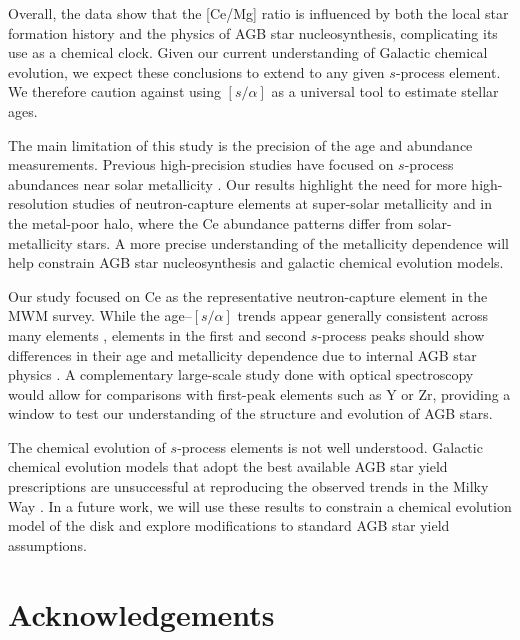 \documentclass[twocolumn,twocolappendix]{aastex701}
\begin{document}
Overall, the data show that the [Ce/Mg] ratio is influenced by both the local star formation history and the physics of AGB star nucleosynthesis, complicating its use as a chemical clock. Given our current understanding of Galactic chemical evolution, we expect these conclusions to extend to any given $s$-process element. We therefore caution against using $[s/\alpha]$ as a universal tool to estimate stellar ages.

The main limitation of this study is the precision of the age and abundance measurements. Previous high-precision studies have focused on $s$-process abundances near solar metallicity \citep[e.g.,][]{nissen_high-precision_2015,tucci_maia_solar_2016,slumstrup_ymg_2017,spina_temporal_2018,nissen_high-precision_2020}. Our results highlight the need for more high-resolution studies of neutron-capture elements at super-solar metallicity and in the metal-poor halo, where the Ce abundance patterns differ from solar-metallicity stars. A more precise understanding of the metallicity dependence will help constrain AGB star nucleosynthesis and galactic chemical evolution models.

Our study focused on Ce as the representative neutron-capture element in the MWM survey. While the age--$[s/\alpha]$ trends appear generally consistent across many elements \citep{casali_tracing_2025}, elements in the first and second $s$-process peaks should show differences in their age and metallicity dependence due to internal AGB star physics \citep{karakas_dawes_2014}. A complementary large-scale study done with optical spectroscopy \citep[e.g., the GALAH survey;][]{buder_galah_2021} would allow for comparisons with first-peak elements such as Y or Zr, providing a window to test our understanding of the structure and evolution of AGB stars.

The chemical evolution of $s$-process elements is not well understood. Galactic chemical evolution models that adopt the best available AGB star yield prescriptions are unsuccessful at reproducing the observed trends in the Milky Way \citep[e.g.,][]{grisoni_modelling_2020,ratcliffe_chemical_2024,molero_constraining_2025}. In a future work, we will use these results to constrain a chemical evolution model of the disk and explore modifications to standard AGB star yield assumptions. 

\section*{Acknowledgements}
\end{document}
